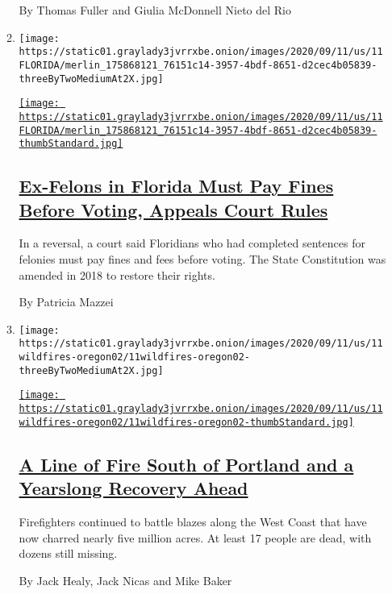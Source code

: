 \begin{enumerate}
\begin{enumerate}
    By Thomas Fuller and Giulia McDonnell Nieto del Rio
  \item
    \texttt{[image: https://static01.graylady3jvrrxbe.onion/images/2020/09/11/us/11FLORIDA/merlin\_175868121\_76151c14-3957-4bdf-8651-d2cec4b05839-threeByTwoMediumAt2X.jpg]}

    \href{/2020/09/11/us/florida-felon-voting-rights.html}{\texttt{[image: https://static01.graylady3jvrrxbe.onion/images/2020/09/11/us/11FLORIDA/merlin\_175868121\_76151c14-3957-4bdf-8651-d2cec4b05839-thumbStandard.jpg]}}

    \hypertarget{ex-felons-in-florida-must-pay-fines-before-voting-appeals-court-rules}{%
    \subsection{\texorpdfstring{\href{/2020/09/11/us/florida-felon-voting-rights.html}{Ex-Felons
    in Florida Must Pay Fines Before Voting, Appeals Court
    Rules}}{Ex-Felons in Florida Must Pay Fines Before Voting, Appeals Court Rules}}\label{ex-felons-in-florida-must-pay-fines-before-voting-appeals-court-rules}}

    In a reversal, a court said Floridians who had completed sentences
    for felonies must pay fines and fees before voting. The State
    Constitution was amended in 2018 to restore their rights.

    By Patricia Mazzei
  \item
    \texttt{[image: https://static01.graylady3jvrrxbe.onion/images/2020/09/11/us/11wildfires-oregon02/11wildfires-oregon02-threeByTwoMediumAt2X.jpg]}

    \href{/2020/09/11/us/fires-oregon-california-washington.html}{\texttt{[image: https://static01.graylady3jvrrxbe.onion/images/2020/09/11/us/11wildfires-oregon02/11wildfires-oregon02-thumbStandard.jpg]}}

    \hypertarget{a-line-of-fire-south-of-portland-and-a-yearslong-recovery-ahead}{%
    \subsection{\texorpdfstring{\href{/2020/09/11/us/fires-oregon-california-washington.html}{A
    Line of Fire South of Portland and a Yearslong Recovery
    Ahead}}{A Line of Fire South of Portland and a Yearslong Recovery Ahead}}\label{a-line-of-fire-south-of-portland-and-a-yearslong-recovery-ahead}}

    Firefighters continued to battle blazes along the West Coast that
    have now charred nearly five million acres. At least 17 people are
    dead, with dozens still missing.

    By Jack Healy, Jack Nicas and Mike Baker
  \end{enumerate}
\end{enumerate}

